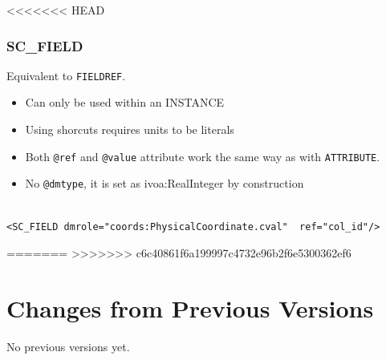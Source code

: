\documentclass[11pt,a4paper]{ivoa}
\begin{document}
<<<<<<< HEAD
\subsubsection{SC\_FIELD}
Equivalent to \texttt{FIELDREF}.


\begin{itemize}
    \item Can only be used within an INSTANCE        
    \item Using shorcuts requires units to be literals    
    \item Both \texttt{@ref} and \texttt{@value} attribute work the same way as with \texttt{ATTRIBUTE}.
    \item No \texttt{@dmtype},  it is set as ivoa:RealInteger by construction
 \end{itemize}


\begin{lstlisting}[caption={\texttt{ivoa:IntegerQuantity} example},style=XML,basicstyle=\small]

<SC_FIELD dmrole="coords:PhysicalCoordinate.cval"  ref="col_id"/>
\end{lstlisting}

=======
>>>>>>> c6c40861f6a199997c4732e96b2f6e5300362ef6

\appendix

\section{Changes from Previous Versions}

No previous versions yet.  



\end{document}
